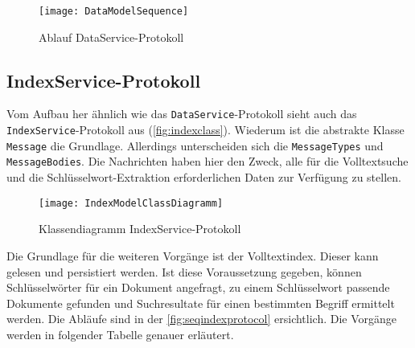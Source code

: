     \begin{figure}[H]
    \centering
    \texttt{[image: DataModelSequence]}
    \caption{Ablauf DataService-Protokoll}
    \label{fig:seqdataprotocol}
    \end{figure}


\subsection{IndexService-Protokoll}


Vom Aufbau her ähnlich wie das \texttt{DataService}-Protokoll sieht auch das \texttt{IndexService}-Protokoll aus (\autoref{fig:indexclass}). Wiederum ist die abstrakte Klasse \texttt{Message} die Grundlage. Allerdings unterscheiden sich die \texttt{Mes\-sa\-ge\-Typ\-es} und \texttt{MessageBodies}. Die Nachrichten haben hier den Zweck, alle für die Volltextsuche und die Schlüs\-sel\-wort-\-Ex\-trak\-tion erforderlichen Daten zur Verfügung zu stellen.

    
    \begin{figure}[H]
    \centering
    \texttt{[image: IndexModelClassDiagramm]}
    \caption{Klassendiagramm IndexService-Protokoll}
    \label{fig:indexclass}
    \end{figure}

Die Grundlage für die weiteren Vorgänge ist der Volltextindex. Dieser kann gelesen und persistiert werden. Ist diese Voraussetzung gegeben, können Schlüsselwörter für ein Dokument angefragt, zu einem Schlüsselwort passende Dokumente gefunden und Suchresultate für einen bestimmten Begriff ermittelt werden. Die Abläufe sind in der \autoref{fig:seqindexprotocol} ersichtlich. Die Vorgänge werden in folgender Tabelle genauer erläutert.


